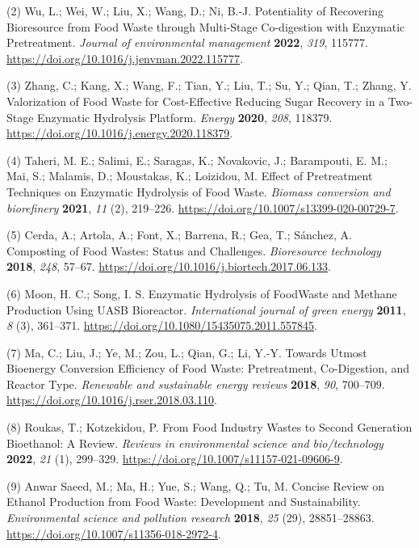 \documentclass[11pt]{article}
\begin{document}
\hypertarget{citeproc_bib_item_2}{(2) Wu, L.; Wei, W.; Liu, X.; Wang, D.; Ni, B.-J. Potentiality of Recovering Bioresource from Food Waste through Multi-Stage Co-digestion with Enzymatic Pretreatment. \textit{Journal of environmental management} \textbf{2022}, \textit{319}, 115777. \url{https://doi.org/10.1016/j.jenvman.2022.115777}.}

\hypertarget{citeproc_bib_item_3}{(3) Zhang, C.; Kang, X.; Wang, F.; Tian, Y.; Liu, T.; Su, Y.; Qian, T.; Zhang, Y. Valorization of Food Waste for Cost-Effective Reducing Sugar Recovery in a Two-Stage Enzymatic Hydrolysis Platform. \textit{Energy} \textbf{2020}, \textit{208}, 118379. \url{https://doi.org/10.1016/j.energy.2020.118379}.}

\hypertarget{citeproc_bib_item_4}{(4) Taheri, M. E.; Salimi, E.; Saragas, K.; Novakovic, J.; Barampouti, E. M.; Mai, S.; Malamis, D.; Moustakas, K.; Loizidou, M. Effect of Pretreatment Techniques on Enzymatic Hydrolysis of Food Waste. \textit{Biomass conversion and biorefinery} \textbf{2021}, \textit{11} (2), 219–226. \url{https://doi.org/10.1007/s13399-020-00729-7}.}

\hypertarget{citeproc_bib_item_5}{(5) Cerda, A.; Artola, A.; Font, X.; Barrena, R.; Gea, T.; Sánchez, A. Composting of Food Wastes: Status and Challenges. \textit{Bioresource technology} \textbf{2018}, \textit{248}, 57–67. \url{https://doi.org/10.1016/j.biortech.2017.06.133}.}

\hypertarget{citeproc_bib_item_6}{(6) Moon, H. C.; Song, I. S. Enzymatic Hydrolysis of FoodWaste and Methane Production Using UASB Bioreactor. \textit{International journal of green energy} \textbf{2011}, \textit{8} (3), 361–371. \url{https://doi.org/10.1080/15435075.2011.557845}.}

\hypertarget{citeproc_bib_item_7}{(7) Ma, C.; Liu, J.; Ye, M.; Zou, L.; Qian, G.; Li, Y.-Y. Towards Utmost Bioenergy Conversion Efficiency of Food Waste: Pretreatment, Co-Digestion, and Reactor Type. \textit{Renewable and sustainable energy reviews} \textbf{2018}, \textit{90}, 700–709. \url{https://doi.org/10.1016/j.rser.2018.03.110}.}

\hypertarget{citeproc_bib_item_8}{(8) Roukas, T.; Kotzekidou, P. From Food Industry Wastes to Second Generation Bioethanol: A Review. \textit{Reviews in environmental science and bio/technology} \textbf{2022}, \textit{21} (1), 299–329. \url{https://doi.org/10.1007/s11157-021-09606-9}.}

\hypertarget{citeproc_bib_item_9}{(9) Anwar Saeed, M.; Ma, H.; Yue, S.; Wang, Q.; Tu, M. Concise Review on Ethanol Production from Food Waste: Development and Sustainability. \textit{Environmental science and pollution research} \textbf{2018}, \textit{25} (29), 28851–28863. \url{https://doi.org/10.1007/s11356-018-2972-4}.}
\end{document}
